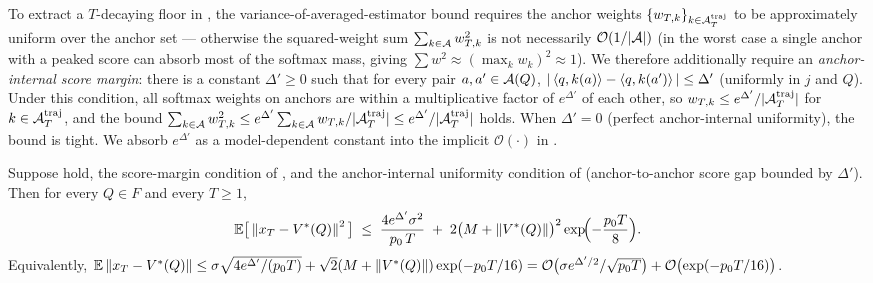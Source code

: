 \begin{remark}\label{rem:anchor_internal_uniform}
To extract a $T$-decaying floor in , the
variance-of-averaged-estimator bound requires the anchor weights
$\{w_{T,k}\}_{k \in \mathcal{A}^{\mathrm{traj}}_T}$ to be approximately
uniform over the anchor set --- otherwise the squared-weight sum
$\sum_{k \in \mathcal{A}} w_{T,k}^2$ is not necessarily $\mathcal{O}(1/|\mathcal{A}|)$
(in the worst case a single anchor with a peaked score can absorb most
of the softmax mass, giving $\sum w^2 \approx (\max_k w_k)^2 \approx 1$).
We therefore additionally require an \emph{anchor-internal score
margin}: there is a constant $\Delta' \ge 0$ such that for every pair
$a, a' \in \mathcal{A}(Q)$, $|\left\langle q, k(a) \right\rangle - \left\langle q, k(a') \right\rangle| \le \Delta'$
(uniformly in $j$ and $Q$). Under this condition, all softmax weights
on anchors are within a multiplicative factor of $e^{\Delta'}$ of each
other, so $w_{T,k} \le e^{\Delta'} / |\mathcal{A}^{\mathrm{traj}}_T|$ for
$k \in \mathcal{A}^{\mathrm{traj}}_T$, and the bound
$\sum_{k \in \mathcal{A}} w_{T,k}^2 \le e^{\Delta'} \sum_{k \in \mathcal{A}} w_{T,k} / |\mathcal{A}^{\mathrm{traj}}_T| \le e^{\Delta'} / |\mathcal{A}^{\mathrm{traj}}_T|$
holds. When $\Delta' = 0$ (perfect anchor-internal uniformity), the
bound is tight. We absorb $e^{\Delta'}$ as a model-dependent constant
into the implicit $\mathcal{O}(\cdot)$ in
.
\end{remark}

\begin{theorem}\label{thm:variance_reduced}
Suppose
hold, the score-margin condition
 of ,
and the anchor-internal uniformity condition of
 (anchor-to-anchor score gap bounded
by $\Delta'$). Then for every $Q \in F$ and every $T \ge 1$,
\begin{align}\label{eq:variance_reduced_bound}
   \mathbb{E}\bigl[\,\left\| x_T - V^*(Q) \right\|^2\,\bigr]
   \;\le\;
   \frac{4 e^{\Delta'} \sigma^2}{p_0\, T}
   \;+\;
   2 \bigl(M + \left\| V^*(Q) \right\|\bigr)^2 \exp\!\Bigl(-\frac{p_0 T}{8}\Bigr).
\end{align}
Equivalently,
$\mathbb{E}\left\| x_T - V^*(Q) \right\|
   \le \sigma \sqrt{4 e^{\Delta'}/(p_0 T)}
   + \sqrt{2} (M + \left\| V^*(Q) \right\|) \exp(-p_0 T/16)
   = \mathcal{O}\bigl(\sigma e^{\Delta'/2}/\sqrt{p_0 T}\bigr)
   + \mathcal{O}\bigl(\exp(-p_0 T/16)\bigr)$.
\end{theorem}

